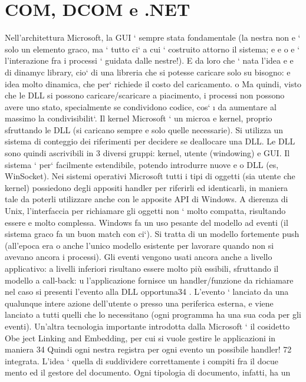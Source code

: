 \documentclass[a4paper,12pt]{article}
\begin{document}
\section{COM, DCOM e .NET}
Nell'architettura Microsoft, la GUI ` sempre stata fondamentale (la nestra non
e
` solo un elemento graco, ma ` tutto ci` a cui ` costruito attorno il sistema;
e
e
o
e
`
l'interazione fra i processi ` guidata dalle nestre!). E da loro che ` nata l'idea
e
e
di dinamyc library, cio` di una libreria che si potesse caricare solo su bisogno:
e
idea molto dinamica, che per` richiede il costo del caricamento.
o
Ma quindi, visto che le DLL si possono caricare/scaricare a piacimento, i
processi non possono avere uno stato, specialmente se condividono codice, cos`
\i{}
da aumentare al massimo la condivisibilit`. Il kernel Microsoft ` un microa
e
kernel, proprio sfruttando le DLL (si caricano sempre e solo quelle necessarie).
Si utilizza un sistema di conteggio dei riferimenti per decidere se deallocare una
DLL.
Le DLL sono quindi ascrivibili in 3 diversi gruppi: kernel, utente (windowing) e GUI. Il sistema ` per` facilmente
estendibile, potendo introdurre nuove
e
o
DLL (es, WinSocket).
Nei sistemi operativi Microsoft tutti i tipi di oggetti (sia utente che kernel)
possiedono degli appositi handler per riferirli ed identicarli, in maniera tale da
poterli utilizzare anche con le apposite API di Windows. A dierenza di Unix,
l'interfaccia per richiamare gli oggetti non ` molto compatta, risultando essere
e
molto complessa.
Windows fa un uso pesante del modello ad eventi (il sistema graco fa un
buon match con ci`). Si tratta di un modello fortemente push (all'epoca era
o
anche l'unico modello esistente per lavorare quando non si avevano ancora i
processi). Gli eventi vengono usati ancora anche a livello applicativo: a livelli
inferiori risultano essere molto più essibili, sfruttando il modello a call-back:
u
l'applicazione fornisce un handler/funzione da richiamare nel caso si presenti
l'evento alla DLL opportuna34 . L'evento ` lanciato da una qualunque intere
azione dell'utente o presso una periferica esterna, e viene lanciato a tutti quelli
che lo necessitano (ogni programma ha una sua coda per gli eventi).
Un'altra tecnologia importante introdotta dalla Microsoft ` il cosidetto Obe
ject Linking and Embedding, per cui si vuole gestire le applicazioni in maniera
34 Quindi
ogni nestra registra per ogni evento un possibile handler!
72
integrata. L'idea ` quella di suddividere correttamente i compiti fra il docue
mento ed il gestore del documento. Ogni tipologia di documento, infatti, ha un
\end{document}
